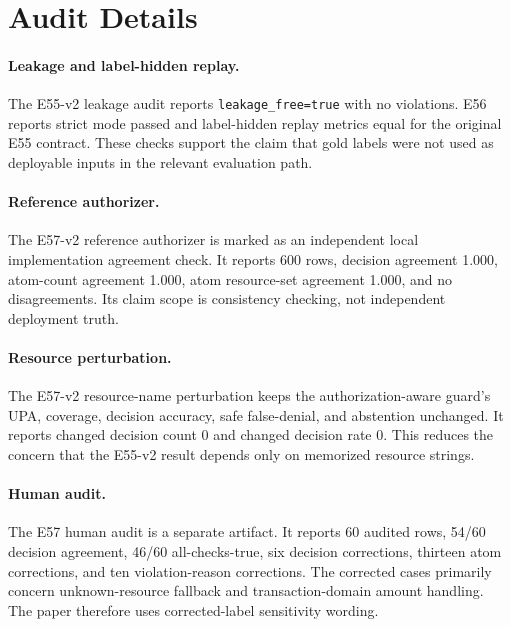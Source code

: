 \section{Audit Details}

\paragraph{Leakage and label-hidden replay.}
The E55-v2 leakage audit reports \texttt{leakage\_free=true} with no violations. E56 reports strict mode passed and label-hidden replay metrics equal for the original E55 contract. These checks support the claim that gold labels were not used as deployable inputs in the relevant evaluation path.

\paragraph{Reference authorizer.}
The E57-v2 reference authorizer is marked as an independent local implementation agreement check. It reports 600 rows, decision agreement 1.000, atom-count agreement 1.000, atom resource-set agreement 1.000, and no disagreements. Its claim scope is consistency checking, not independent deployment truth.

\paragraph{Resource perturbation.}
The E57-v2 resource-name perturbation keeps the authorization-aware guard's UPA, coverage, decision accuracy, safe false-denial, and abstention unchanged. It reports changed decision count 0 and changed decision rate 0. This reduces the concern that the E55-v2 result depends only on memorized resource strings.

\paragraph{Human audit.}
The E57 human audit is a separate artifact. It reports 60 audited rows, 54/60 decision agreement, 46/60 all-checks-true, six decision corrections, thirteen atom corrections, and ten violation-reason corrections. The corrected cases primarily concern unknown-resource fallback and transaction-domain amount handling. The paper therefore uses corrected-label sensitivity wording.
